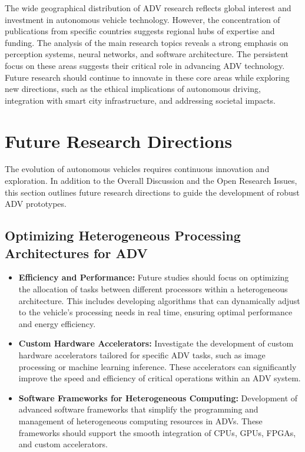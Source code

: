 \documentclass[lettersize,journal]{IEEEtran}
\begin{document}
The wide geographical distribution of ADV research reflects global interest and investment in autonomous vehicle technology. However, the concentration of publications from specific countries suggests regional hubs of expertise and funding. The analysis of the main research topics reveals a strong emphasis on perception systems, neural networks, and software architecture. The persistent focus on these areas suggests their critical role in advancing ADV technology. Future research should continue to innovate in these core areas while exploring new directions, such as the ethical implications of autonomous driving, integration with smart city infrastructure, and addressing societal impacts.


\section{Future Research Directions}
The evolution of autonomous vehicles requires continuous innovation and exploration. In addition to the Overall Discussion and the Open Research Issues, this section outlines future research directions to guide the development of robust ADV prototypes.

\subsection{Optimizing Heterogeneous Processing Architectures for ADV}
\begin{itemize}
    \item \textbf{Efficiency and Performance:} Future studies should focus on optimizing the allocation of tasks between different processors within a heterogeneous architecture. This includes developing algorithms that can dynamically adjust to the vehicle's processing needs in real time, ensuring optimal performance and energy efficiency.
    \item \textbf{Custom Hardware Accelerators:} Investigate the development of custom hardware accelerators tailored for specific ADV tasks, such as image processing or machine learning inference. These accelerators can significantly improve the speed and efficiency of critical operations within an ADV system.
    \item \textbf{Software Frameworks for Heterogeneous Computing:} Development of advanced software frameworks that simplify the programming and management of heterogeneous computing resources in ADVs. These frameworks should support the smooth integration of CPUs, GPUs, FPGAs, and custom accelerators.
\end{itemize}
\end{document}
